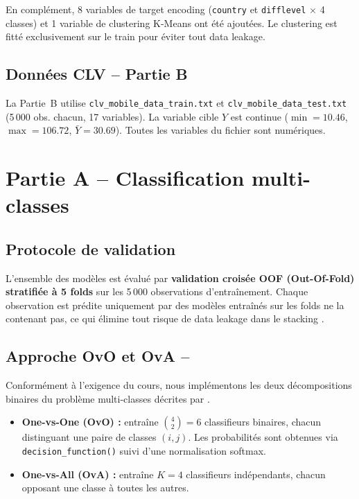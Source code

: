 \documentclass[11pt,a4paper]{article}
\newcommand{\code}[1]{\texttt{\small #1}}
\begin{document}
En complément, 8 variables de target encoding (\code{country} et
\code{difflevel} $\times$ 4 classes) et 1 variable de clustering K-Means
ont été ajoutées. Le clustering est fitté exclusivement sur le train pour
éviter tout data leakage.

\subsection{Données CLV -- Partie B}

La Partie~B utilise \code{clv\_mobile\_data\_train.txt} et
\code{clv\_mobile\_data\_test.txt} (5\,000 obs. chacun, 17 variables).
La variable cible $Y$ est continue ($\min=10.46$, $\max=106.72$,
$\bar{Y}=30.69$). Toutes les variables du fichier sont numériques.

\section{Partie A -- Classification multi-classes}

\subsection{Protocole de validation}

L'ensemble des modèles est évalué par \textbf{validation croisée OOF
(Out-Of-Fold) stratifiée à 5 folds} sur les 5\,000 observations
d'entraînement. Chaque observation est prédite uniquement par des modèles
entraînés sur les folds ne la contenant pas, ce qui élimine tout risque de
data leakage dans le stacking \parencite{wolpert1992, breiman1996}.

\subsection{Approche OvO et OvA -- \textcite{galar2011}}

Conformément à l'exigence du cours, nous implémentons les deux
décompositions binaires du problème multi-classes décrites par
\textcite{galar2011}.

\begin{itemize}
  \item \textbf{One-vs-One (OvO) :} entraîne $\binom{4}{2} = 6$
    classifieurs binaires, chacun distinguant une paire de classes $(i,j)$.
    Les probabilités sont obtenues via \code{decision\_function()} suivi
    d'une normalisation softmax.
  \item \textbf{One-vs-All (OvA) :} entraîne $K=4$ classifieurs
    indépendants, chacun opposant une classe à toutes les autres.
\end{itemize}
\end{document}
